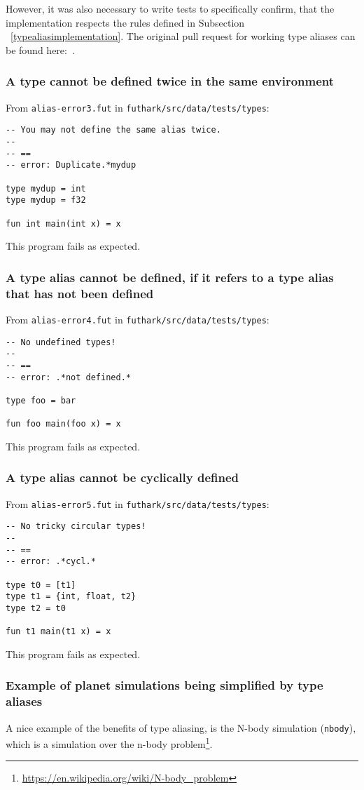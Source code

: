 However, it was also necessary to write tests to specifically confirm, that the
implementation respects the rules defined in Subsection ~\ref{typealiasimplementation}.
The original pull request for working type aliases can be found here:~\cite{typealias_commit}.
\subsubsection{A type cannot be defined twice in the same environment}
From \texttt{alias-error3.fut} in \texttt{futhark/src/data/tests/types}:
\begin{verbatim}
-- You may not define the same alias twice.
--
-- ==
-- error: Duplicate.*mydup

type mydup = int
type mydup = f32

fun int main(int x) = x
\end{verbatim}

This program fails as expected.

\subsubsection{A type alias cannot be defined, if it refers to a type alias that has not been defined}
From \texttt{alias-error4.fut} in \texttt{futhark/src/data/tests/types}:
\begin{verbatim}
-- No undefined types!
--
-- ==
-- error: .*not defined.*

type foo = bar

fun foo main(foo x) = x
\end{verbatim}
This program fails as expected.

\subsubsection{A type alias cannot be cyclically defined}
From \texttt{alias-error5.fut} in \texttt{futhark/src/data/tests/types}:
\begin{verbatim}
-- No tricky circular types!
--
-- ==
-- error: .*cycl.*

type t0 = [t1]
type t1 = {int, float, t2}
type t2 = t0

fun t1 main(t1 x) = x
\end{verbatim}
This program fails as expected.
\clearpage
\subsubsection{Example of planet simulations being simplified by type aliases}\label{nbody}
A nice example of the benefits of type aliasing, is the N-body simulation
(\texttt{nbody}), which is a simulation over the n-body
problem\footnote{\url{https://en.wikipedia.org/wiki/N-body\_problem}}.

